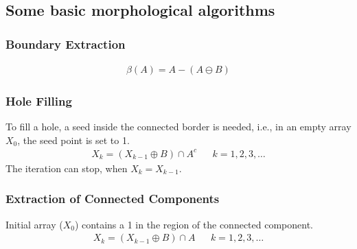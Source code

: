 \subsection{Some basic morphological algorithms}
\subsubsection{Boundary Extraction}
\begin{align*}
\beta(A)=A-(A\ominus B)
\end{align*}

\subsubsection{Hole Filling}
To fill a hole, a seed inside the connected border is needed, i.e., in an empty array $X_0$, the seed point is set to 1.
\begin{align*}
X_k=(X_{k-1}\oplus B)\cap A^c && k=1,2,3,\ldots
\end{align*}
The iteration can stop, when $X_k = X_{k-1}$.

\subsubsection{Extraction of Connected Components}
Initial array ($X_0$) contains a 1 in the region of the connected component.
\begin{align*}
X_k=(X_{k-1}\oplus B)\cap A && k=1,2,3,\ldots
\end{align*}

